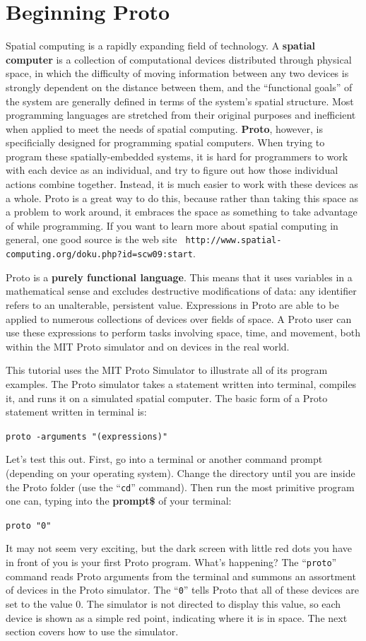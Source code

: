 \documentclass{article}
\newcommand\code[1]{\begin{center}\var{#1}\end{center}}
\newcommand\var[1]{{\tt #1}}
\newcommand\qvar[1]{``{\tt #1}''}
\begin{document}
\section{Beginning Proto}

Spatial computing is a rapidly expanding field of technology.  A {\bf
  spatial computer} is a collection of computational devices
distributed through physical space, in which the difficulty of moving
information between any two devices is strongly dependent on the
distance between them, and the ``functional goals'' of the system are
generally defined in terms of the system's spatial structure.  Most
programming languages are stretched from their original purposes and
inefficient when applied to meet the needs of spatial computing.
{\bf Proto}, however, is specificially designed for programming spatial
computers.  When trying to program these spatially-embedded systems,
it is hard for programmers to work with each device as an individual,
and try to figure out how those individual actions combine together.
Instead, it is much easier to work with these devices as a whole.
Proto is a great way to do this, because rather than taking this space
as a problem to work around, it embraces the space as something to
take advantage of while programming.  If you want to learn more about
spatial computing in general, one good source is the web site {\tt
  http://www.spatial-computing.org/doku.php?id=scw09:start}.

Proto is a {\bf purely functional language}.  This means that it uses
variables in a mathematical sense and excludes destructive
modifications of data: any identifier refers to an unalterable,
persistent value.  Expressions in Proto are able to be applied to
numerous collections of devices over fields of space.  A Proto user
can use these expressions to perform tasks involving space, time, and
movement, both within the MIT Proto simulator and on devices in the
real world.

This tutorial uses the MIT Proto Simulator to illustrate all of its
program examples.  The Proto simulator takes a statement written into
terminal, compiles it, and runs it on a simulated spatial
computer.  The basic form of a Proto statement written in terminal is:
\code{proto -arguments "(expressions)"}
Let's test this out.  First, go into a
terminal or another command prompt (depending on your operating
system).  Change the directory until you are inside the Proto folder
(use the \qvar{cd} command).  Then run the most primitive program one can,
typing into the {\bf prompt\$} of your terminal:
\code{proto "0"}
It may not seem very exciting, but the dark screen
with little red dots you have in front of you is your first Proto
program.  What's happening?  The \qvar{proto} command reads Proto arguments
from the terminal and summons an assortment of devices in the Proto
simulator.  The \qvar{0} tells Proto that all of these devices are set to
the value 0.  The simulator is not directed to display this value, so
each device is shown as a simple red point, indicating where it is in
space.  The next section covers how to use the simulator.
\end{document}
